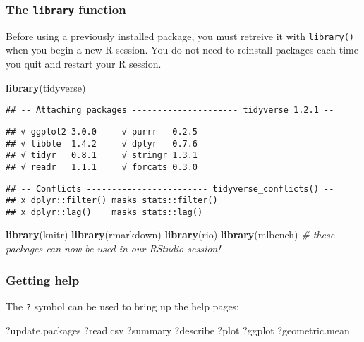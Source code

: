 \documentclass[]{article}
\newenvironment{Shaded}{\begin{snugshade}}{\end{snugshade}}
\newcommand{\KeywordTok}[1]{\textcolor[rgb]{0.13,0.29,0.53}{\textbf{#1}}}
\newcommand{\CommentTok}[1]{\textcolor[rgb]{0.56,0.35,0.01}{\textit{#1}}}
\newcommand{\NormalTok}[1]{#1}
\begin{document}
\subsubsection{\texorpdfstring{The \texttt{library}
function}{The library function}}\label{the-library-function}

Before using a previously installed package, you must retreive it with
\texttt{library()} when you begin a new R session. You do not need to
reinstall packages each time you quit and restart your R session.

\begin{Shaded}
\begin{Highlighting}[]
\KeywordTok{library}\NormalTok{(tidyverse)}
\end{Highlighting}
\end{Shaded}

\begin{verbatim}
## -- Attaching packages --------------------- tidyverse 1.2.1 --
\end{verbatim}

\begin{verbatim}
## √ ggplot2 3.0.0     √ purrr   0.2.5
## √ tibble  1.4.2     √ dplyr   0.7.6
## √ tidyr   0.8.1     √ stringr 1.3.1
## √ readr   1.1.1     √ forcats 0.3.0
\end{verbatim}

\begin{verbatim}
## -- Conflicts ------------------------ tidyverse_conflicts() --
## x dplyr::filter() masks stats::filter()
## x dplyr::lag()    masks stats::lag()
\end{verbatim}

\begin{Shaded}
\begin{Highlighting}[]
\KeywordTok{library}\NormalTok{(knitr)}
\KeywordTok{library}\NormalTok{(rmarkdown)}
\KeywordTok{library}\NormalTok{(rio)}
\KeywordTok{library}\NormalTok{(mlbench)}
\CommentTok{# these packages can now be used in our RStudio session!}
\end{Highlighting}
\end{Shaded}

\subsubsection{Getting help}\label{getting-help}

The \texttt{?} symbol can be used to bring up the help pages:

\begin{Shaded}
\begin{Highlighting}[]
\NormalTok{?update.packages}
\NormalTok{?read.csv}
\NormalTok{?summary}
\NormalTok{?describe}
\NormalTok{?plot}
\NormalTok{?ggplot}
\NormalTok{?geometric.mean}
\end{Highlighting}
\end{Shaded}
\end{document}

